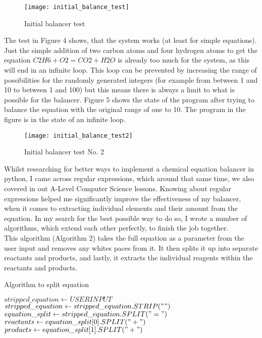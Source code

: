 \documentclass[a4paper,12pt]{article}
\begin{document}
\begin{figure} [h]
	\centering
	\texttt{[image: initial\_balance\_test]}
	\caption{Initial balancer test}
	\label{fig:initial_balance_test}
\end{figure}

The test in Figure 4 shows, that the system works (at least for simple equations). Just the simple addition of two carbon atoms and four hydrogen atoms to get the equation $ C2H6 + O2 = CO2 + H2O$ is already too much for the system, as this will end in an infinite loop. This loop can be prevented by increasing the range of possibilities for the randomly generated integers (for example from between 1 and 10 to between 1 and 100) but this means there is always a limit to what is possible for the balancer. Figure 5 shows the state of the program after trying to balance the equation with the original range of one to 10. The program in the figure is in the state of an infinite loop.

\begin{figure} [h]
	\centering
	\texttt{[image: initial\_balance\_test2]}
	\caption{Initial balancer test No. 2}
	\label{fig:initial_balance_test2}
\end{figure}

\newpage

Whilst researching for better ways to implement a chemical equation balancer in python, I came across regular expressions, which around that same time, we also covered in out A-Level Computer Science lessons. Knowing about regular expressions helped me significantly improve the effectiveness of my balancer, when it comes to extracting individual elements and their amount from the equation. In my search for the best possible way to do so, I wrote a number of algorithms, which extend each other perfectly, to finish the job together.\\
This algorithm (Algorithm 2) takes the full equation as a parameter from the user input and removes any whites paces from it. It then splits it up into separate reactants and products, and lastly, it extracts the individual reagents within the reactants and products.
\begin{algorithm}
\caption{Algorithm to split equation}\label{alg:cap}
\begin{algorithmic}
\State $ stripped\_equation \gets USERINPUT$
\State $ stripped\_equation \gets stripped\_equation.STRIP(" ")$
\State $ equation\_split \gets stripped\_equation.SPLIT("=")$
\State $ reactants \gets equation\_split[0].SPLIT("+")$
\State $ products \gets equation\_split[1].SPLIT("+")$
\EndFunction
\end{algorithmic}
\end{algorithm}
\end{document}
